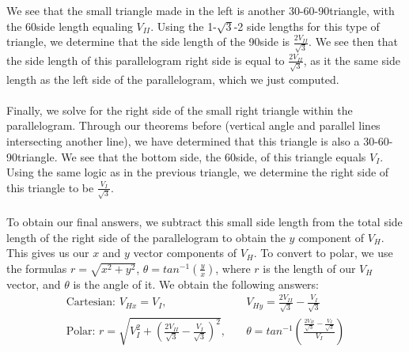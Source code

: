 \documentclass[12pt, a4paper]{article}
\begin{document}
We see that the small triangle made in the left is another 30-60-90\degree triangle, with the 60\degree side length equaling $V_{II}$. Using the 1-$\sqrt{3}$-2 side lengths for this type of triangle, we determine that the side length of the 90\degree side is $\frac{2V_{II}}{\sqrt{3}}$. We see then that the side length of this parallelogram right side is equal to $\frac{2V_{II}}{\sqrt{3}}$, as it the same side length as the left side of the parallelogram, which we just computed. \\ \\
Finally, we solve for the right side of the small right triangle within the parallelogram. Through our theorems before (vertical angle and parallel lines intersecting another line), we have determined that this triangle is also a 30-60-90\degree triangle. We see that the bottom side, the 60\degree side, of this triangle equals $V_I$. Using the same logic as in the previous triangle, we determine the right side of this triangle to be $\frac{V_I}{\sqrt{3}}$. \\ \\ 
To obtain our final answers, we subtract this small side length from the total side length of the right side of the parallelogram to obtain the $y$ component of $V_H$. This gives us our $x$ and $y$ vector components of $V_H$. To convert to polar, we use the formulas $r = \sqrt{x^2 + y^2}$, $\theta = tan^{-1}(\frac{y}{x})$, where $r$ is the length of our  $V_H$ vector, and $\theta$ is the angle of it. We obtain the following answers:
\begin{align*}
\text{Cartesian: } V_{Hx} = V_I ,&\quad V_{Hy} =  \frac{2V_{II}}{\sqrt{3}} -\frac{V_I}{\sqrt{3}} \\
\text{Polar: } r = \sqrt{ V_I ^2 + (\frac{2V_{II}}{\sqrt{3}} -\frac{V_I}{\sqrt{3}})^2} ,&\quad \theta = tan^{-1}(\frac{\frac{2V_{II}}{\sqrt{3}} -\frac{V_I}{\sqrt{3}}}{V_I}) 
\end{align*}
\end{document}
